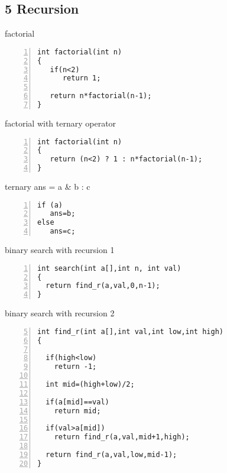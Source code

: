 \documentclass{beamer}
\begin{document}
\subsection*{5 Recursion}
\begin{frame}[fragile]{factorial}
\begin{lstlisting}[numbers=left]
int factorial(int n)
{
   if(n<2)
      return 1;

   return n*factorial(n-1);
}
\end{lstlisting}
\end{frame}


\begin{frame}[fragile]{factorial with ternary operator}
\begin{lstlisting}[numbers=left]
int factorial(int n)
{
   return (n<2) ? 1 : n*factorial(n-1);
}
\end{lstlisting}
\end{frame}


\begin{frame}[fragile]{ternary ans = a \& b : c }
\begin{lstlisting}[numbers=left]
if (a)
   ans=b;
else 
   ans=c;
\end{lstlisting}
\end{frame}




\begin{frame}[fragile]{binary search with recursion 1}
\begin{lstlisting}[numbers=left]
int search(int a[],int n, int val)
{
  return find_r(a,val,0,n-1);
}
\end{lstlisting}
\end{frame}

\begin{frame} [fragile]{binary search with recursion 2}
\begin{lstlisting}[numbers=left,firstnumber=5]
int find_r(int a[],int val,int low,int high)
{

  if(high<low)
    return -1;

  int mid=(high+low)/2;

  if(a[mid]==val)
    return mid;

  if(val>a[mid])
    return find_r(a,val,mid+1,high);
  
  return find_r(a,val,low,mid-1);
}
\end{lstlisting}
\end{frame}
\end{document}
